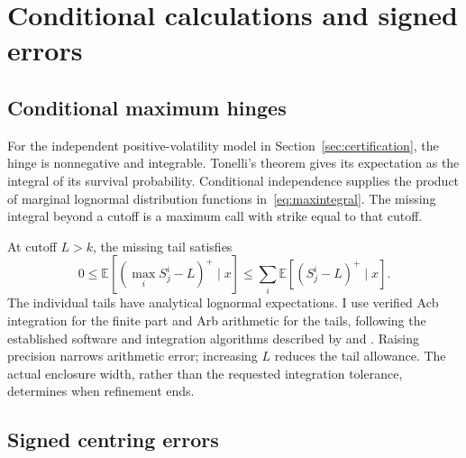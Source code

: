 \documentclass[11pt]{article}
\newcommand{\E}{\mathbb E}
\begin{document}
\section{Conditional calculations and signed errors}
\label{app:conditional-calculations}

\subsection{Conditional maximum hinges}

For the independent positive-volatility model in Section~\ref{sec:certification}, the hinge is nonnegative and integrable. Tonelli's theorem gives its expectation as the integral of its survival probability. Conditional independence supplies the product of marginal lognormal distribution functions in~\eqref{eq:maxintegral}. The missing integral beyond a cutoff is a maximum call with strike equal to that cutoff.

At cutoff $L>k$, the missing tail satisfies
\begin{equation}
 0\leq\E[(\max_i S^i_j-L)^+\mid x]
 \leq\sum_i\E[(S^i_j-L)^+\mid x].
\end{equation}
The individual tails have analytical lognormal expectations. I use verified Acb integration for the finite part and Arb arithmetic for the tails, following the established software and integration algorithms described by \citet{johansson2017} and \citet{johansson2018}. Raising precision narrows arithmetic error; increasing $L$ reduces the tail allowance. The actual enclosure width, rather than the requested integration tolerance, determines when refinement ends.

\subsection{Signed centring errors}
\label{app:signed-errors}
\end{document}
